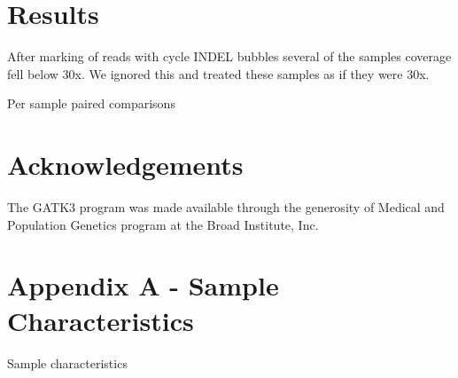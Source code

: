 \documentclass{article}
\begin{document}
  \section{Results}
  After marking of reads with cycle INDEL bubbles several of the samples
  coverage fell below 30x. We ignored this and treated these samples as if they
  were 30x.
  \begin{table}[!h]
    \begin{center}
      \label{psc_table}
      \caption{Per sample paired comparisons}
	\end{center}
  \end{table}

  \section{Acknowledgements}
  The GATK3 program was made available through the generosity of Medical and
  Population Genetics program at the Broad Institute, Inc.

  \newpage
  \section{Appendix A - Sample Characteristics}
  \begin{table}[!h]
    \begin{center}
      \label{sample_table}
      \caption{Sample characteristics}
    \end{center}
  \end{table}
\end{document}
